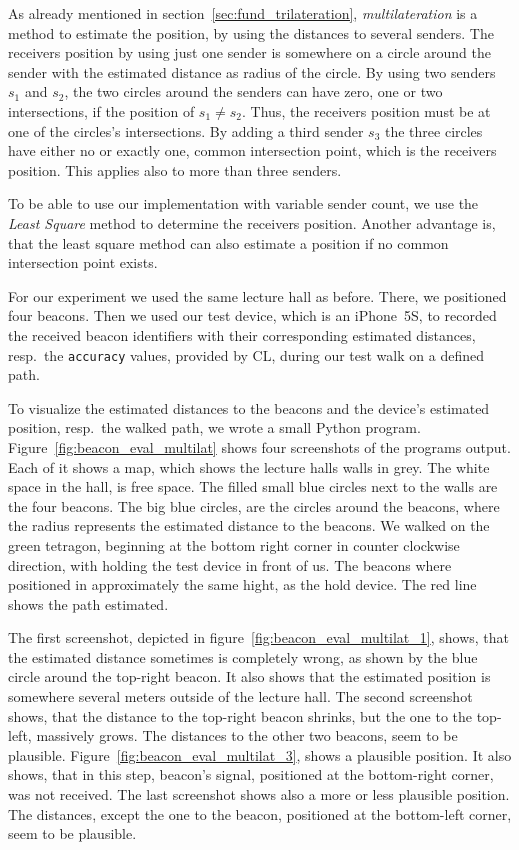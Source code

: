 As already mentioned in section~\ref{sec:fund_trilateration}, \emph{multilateration} is a method to estimate the position, by using the distances to several senders. The receivers position by using just one sender is somewhere on a circle around the sender with the estimated distance as radius of the circle.
By using two senders $s_1$ and $s_2$, the two circles around the senders can have zero, one or two intersections, if the position of $s_1 \neq s_2$. Thus, the receivers position must be at one of the circles's intersections.
By adding a third sender $s_3$ the three circles have either no or exactly one, common intersection point, which is the receivers position. This applies also to more than three senders.

To be able to use our implementation with variable sender count, we use the \emph{Least Square} method to determine the receivers position. Another advantage is, that the least square method can also estimate a position if no common intersection point exists.

For our experiment we used the same lecture hall as before. There, we positioned four beacons. Then we used our test device, which is an iPhone~5S, to recorded the received beacon identifiers with their corresponding estimated distances, resp.\ the \texttt{accuracy} values, provided by \acs{CL}, during our test walk on a defined path.

To visualize the estimated distances to the beacons and the device's estimated position, resp.\ the walked path, we wrote a small Python program. Figure~\ref{fig:beacon_eval_multilat} shows four screenshots of the programs output. Each of it shows a map, which shows the lecture halls walls in grey. The white space in the hall, is free space. The filled small blue circles next to the walls are the four beacons. The big blue circles, are the circles around the beacons, where the radius represents the estimated distance to the beacons. We walked on the green tetragon, beginning at the bottom right corner in counter clockwise direction, with holding the test device in front of us. The beacons where positioned in approximately the same hight, as the hold device. The red line shows the path estimated.

The first screenshot, depicted in figure~\ref{fig:beacon_eval_multilat_1}, shows, that the estimated distance sometimes is completely wrong, as shown by the blue circle around the top-right beacon. It also shows that the estimated position is somewhere several meters outside of the lecture hall. The second screenshot shows, that the distance to the top-right beacon shrinks, but the one to the top-left, massively grows. The distances to the other two beacons, seem to be plausible. Figure~\ref{fig:beacon_eval_multilat_3}, shows a plausible position. It also shows, that in this step, beacon's signal, positioned at the bottom-right corner, was not received. The last screenshot shows also a more or less plausible position. The distances, except the one to the beacon, positioned at the bottom-left corner, seem to be plausible.

